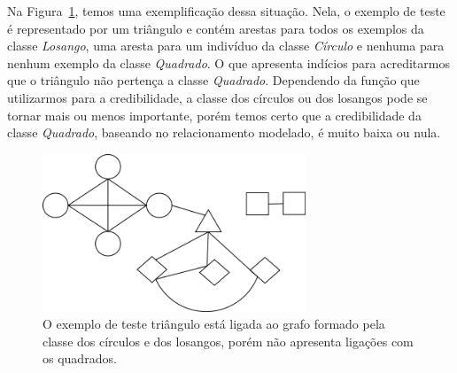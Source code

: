 
Na Figura~\ref{fig::grafo}, temos uma exemplificação dessa situação. Nela, o exemplo de teste é representado por um triângulo e contém arestas para todos os exemplos da classe \textit{Losango}, uma aresta para um indivíduo da classe \textit{Círculo} e nenhuma para nenhum exemplo da classe \textit{Quadrado}. O que apresenta indícios para acreditarmos que o triângulo não pertença a classe \textit{Quadrado}. Dependendo da função que utilizarmos para a credibilidade, a classe dos círculos ou dos losangos pode se tornar mais ou menos importante, porém temos certo que a credibilidade da classe \textit{Quadrado}, baseando no relacionamento modelado, é muito baixa ou nula.

\begin{figure}[ht!]
\centering
\includegraphics[width=0.7\textwidth]{figures/grafo.png}
\caption{O exemplo de teste triângulo está ligada ao grafo formado pela classe dos círculos e dos losangos, porém não apresenta ligações com os quadrados.}
\label{fig::grafo}
\end{figure}


